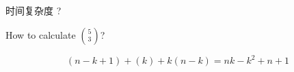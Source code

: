 \begin{frame}{}

  \pause
  \vspace{0.30cm}
  \centerline{\Large 时间复杂度 ?}
\end{frame}

\begin{frame}{}

  \pause
  \centerline{\large {} How to calculate $\binom{5}{3}$?}
\end{frame}

\begin{frame}{}
  

  \pause
  \[
    (n-k+1) + (k) + k (n-k) = nk - k^2 + n + 1
  \]
\end{frame}
